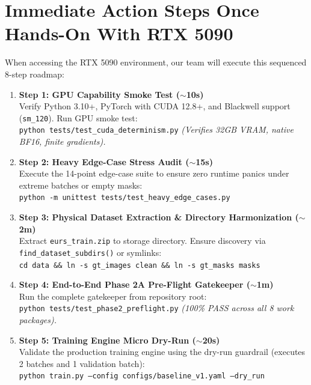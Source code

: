 \documentclass[10pt,a4paper]{article}
\begin{document}
\newpage

\section{Immediate Action Steps Once Hands-On With RTX 5090}
When accessing the RTX 5090 environment, our team will execute this sequenced 8-step roadmap:

\begin{enumerate}[leftmargin=1.4em,noitemsep,topsep=3pt]
    \item \textbf{Step 1: GPU Capability Smoke Test ($\sim$10s)}\\
    Verify Python 3.10+, PyTorch with CUDA 12.8+, and Blackwell support (\texttt{sm\_120}). Run GPU smoke test:\\
    \texttt{python tests/test\_cuda\_determinism.py} \quad\textit{(Verifies 32GB VRAM, native BF16, finite gradients).}

    \item \textbf{Step 2: Heavy Edge-Case Stress Audit ($\sim$15s)}\\
    Execute the 14-point edge-case suite to ensure zero runtime panics under extreme batches or empty masks:\\
    \texttt{python -m unittest tests/test\_heavy\_edge\_cases.py}

    \item \textbf{Step 3: Physical Dataset Extraction \& Directory Harmonization ($\sim$2m)}\\
    Extract \texttt{eurs\_train.zip} to storage directory. Ensure discovery via \texttt{find\_dataset\_subdirs()} or symlinks:\\
    \texttt{cd data \&\& ln -s gt\_images clean \&\& ln -s gt\_masks masks}

    \item \textbf{Step 4: End-to-End Phase 2A Pre-Flight Gatekeeper ($\sim$1m)}\\
    Run the complete gatekeeper from repository root:\\
    \texttt{python tests/test\_phase2\_preflight.py} \quad\textit{(100\% PASS across all 8 work packages).}

    \item \textbf{Step 5: Training Engine Micro Dry-Run ($\sim$20s)}\\
    Validate the production training engine using the dry-run guardrail (executes 2 batches and 1 validation batch):\\
    \texttt{python train.py --config configs/baseline\_v1.yaml --dry\_run}


\end{enumerate}
\end{document}
